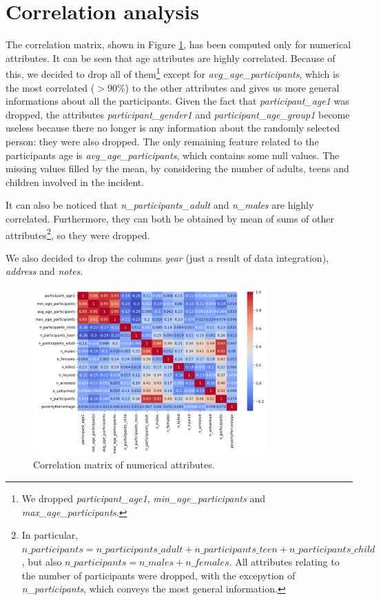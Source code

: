 \documentclass[10pt,a4paper]{report}
\begin{document}
\section{Correlation analysis}

The correlation matrix, shown in Figure \ref{corr_matrix_dp}, has been computed only for numerical attributes.
It can be seen that age attributes are highly correlated.
Because of this, we decided to drop all of them\footnote{We dropped \textit{participant\_age1}, \textit{min\_age\_participants} and \textit{max\_age\_participants}.} except for \textit{avg\_age\_participants}, which is the most correlated ($>90\%$) to the other attributes and gives us more general informations about all the participants.
Given the fact that \textit{participant\_age1} was dropped, the attributes \textit{participant\_gender1} and \textit{participant\_age\_group1} become useless because there no longer is any information about the randomly selected person: they were also dropped.
The only remaining feature related to the participants age is \textit{avg\_age\_participants}, which contains some null values.
The missing values filled by the mean, by considering the number of adults, teens and children involved in the incident.

It can also be noticed that \textit{n\_participants\_adult} and \textit{n\_males} are highly correlated.
Furthermore, they can both be obtained by mean of sums of other attributes\footnote{In particular,
$n\_participants = n\_participants\_adult + n\_participants\_teen + n\_participants\_child$, but also $n\_participants = n\_males + n\_females$.
All attributes relating to the number of participants were dropped, with the excepytion of \textit{n\_participants}, which conveys the most general information.}, so they were dropped.

We also decided to drop the columns \textit{year} (just a result of data integration), \textit{address} and \textit{notes}.

\begin{figure}[h]
	\includegraphics[width=0.8\textwidth]{corr_matrix_dp}
	\centering
	\caption{Correlation matrix of numerical attributes.}
	\label{corr_matrix_dp}
\end{figure}
\end{document}

